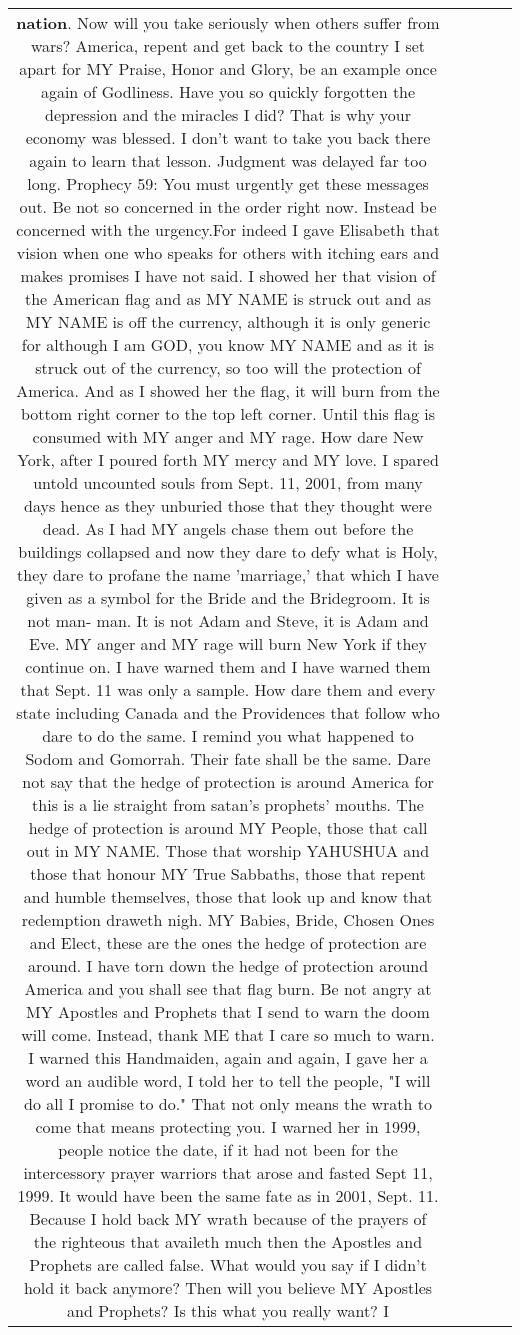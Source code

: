 \documentclass[11pt]{article}
\newlength\mylength
\begin{document}
\begin{center}
\begin{longtable}{|C{.65\mylength}|C{.30\mylength}|C{.12\mylength}|C{.12\mylength}|C{.12\mylength}|}
\textbf{nation}. Now will you take seriously when others suffer from wars? America, repent and get back to the country I set apart for MY Praise, Honor and Glory, be an example once again of Godliness. Have you so quickly forgotten the depression and the miracles I did? That is why your economy was blessed. I don't want to take you back there again to learn that lesson. Judgment was delayed far too long. Prophecy 59: You must urgently get these messages out. Be not so concerned in the order right now. Instead be concerned with the urgency.For indeed I gave Elisabeth that vision when one who speaks for others with itching ears and makes promises I have not said. I showed her that vision of the American flag and as MY NAME is struck out and as MY NAME is off the currency, although it is only generic for although I am GOD, you know MY NAME and as it is struck out of the currency, so too will the protection of America. And as I showed her the flag, it will burn from the bottom right corner to the top left corner. Until this flag is consumed with MY anger and MY rage. How dare New York, after I poured forth MY mercy and MY love. I spared untold uncounted souls from Sept. 11, 2001, from many days hence as they unburied those that they thought were dead. As I had MY angels chase them out before the buildings collapsed and now they dare to defy what is Holy, they dare to profane the name 'marriage,' that which I have given as a symbol for the Bride and the Bridegroom. It is not man- man. It is not Adam and Steve, it is Adam and Eve. MY anger and MY rage will burn New York if they continue on. I have warned them and I have warned them that Sept. 11 was only a sample. How dare them and every state including Canada and the Providences that follow who dare to do the same. I remind you what happened to Sodom and Gomorrah. Their fate shall be the same. Dare not say that the hedge of protection is around America for this is a lie straight from satan's prophets' mouths. The hedge of protection is around MY People, those that call out in MY NAME. Those that worship YAHUSHUA and those that honour MY True Sabbaths, those that repent and humble themselves, those that look up and know that redemption draweth nigh. MY Babies, Bride, Chosen Ones and Elect, these are the ones the hedge of protection are around. I have torn down the hedge of protection around America and you shall see that flag burn. Be not angry at MY Apostles and Prophets that I send to warn the doom will come. Instead, thank ME that I care so much to warn. I warned this Handmaiden, again and again, I gave her a word an audible word, I told her to tell the people, "I will do all I promise to do." That not only means the wrath to come that means protecting you. I warned her in 1999, people notice the date, if it had not been for the intercessory prayer warriors that arose and fasted Sept 11, 1999. It would have been the same fate as in 2001, Sept. 11. Because I hold back MY wrath because of the prayers of the righteous that availeth much then the Apostles and Prophets are called false. What would you say if I didn't hold it back anymore? Then will you believe MY Apostles and Prophets? Is this what you really want? I 
\end{longtable}
\end{center}
\end{document}
